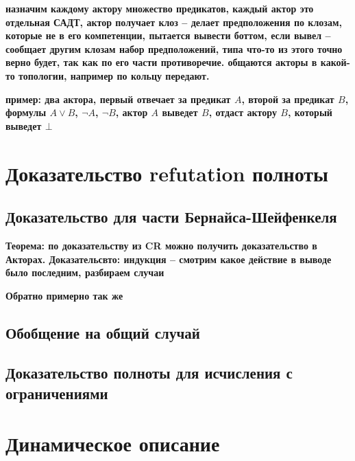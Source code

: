



\textbf{назначим каждому актору множество предикатов, каждый актор это отдельная САДТ, актор получает клоз -- делает предположения по клозам, которые не в его компетенции, пытается вывести боттом, если вывел -- сообщает другим клозам набор предположений, типа что-то из этого точно верно будет, так как по его части противоречие. общаются акторы в какой-то топологии, например по кольцу передают.}

\textbf{пример: два актора, первый отвечает за предикат $A$, второй за предикат $B$, формулы $A \vee B$, $\neg A$, $\neg B$, актор $A$ выведет $B$, отдаст актору $B$, который выведет $\bot$ }


\section{Доказательство refutation полноты}

\subsection{Доказательство для части Бернайса-Шейфенкеля}

% 
% 

\textbf{Теорема: по доказательству из CR можно получить доказательство в Акторах. Доказательсвто: индукция -- смотрим какое действие в выводе было последним, разбираем случаи}

\textbf{Обратно примерно так же}

\subsection{Обобщение на общий случай}

\subsection{Доказательство полноты для исчисления с ограничениями}

\section{Динамическое описание }